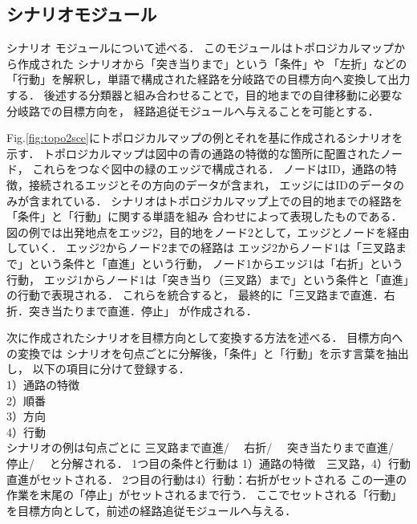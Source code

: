 \documentclass{sice-si}
\begin{document}
\subsection{シナリオモジュール}
シナリオ
モジュールについて述べる．
このモジュールはトポロジカルマップから作成された
シナリオから「突き当りまで」という「条件」や
「左折」などの「行動」を解釈し，単語で構成された経路を分岐路での目標方向へ変換して出力する．
後述する分類器と組み合わせることで，目的地までの自律移動に必要な分岐路での目標方向を，
経路追従モジュールへ与えることを可能とする．
\par
Fig.\ref{fig:topo2sce}にトポロジカルマップの例とそれを基に作成されるシナリオを示す．
トポロジカルマップは図中の青の通路の特徴的な箇所に配置されたノード，
これらをつなぐ図中の緑のエッジで構成される．
ノードはID，通路の特徴，接続されるエッジとその方向のデータが含まれ，
エッジにはIDのデータのみが含まれている．
シナリオはトポロジカルマップ上での目的地までの経路を「条件」と「行動」に関する単語を組み
合わせによって表現したものである．
図の例では出発地点をエッジ2，目的地をノード2として，エッジとノードを経由していく．
エッジ2からノード2までの経路は
エッジ2からノード1は「三叉路まで」という条件と「直進」という行動，
ノード1からエッジ1は「右折」という行動，
エッジ1からノード1は「突き当り（三叉路）まで」という条件と「直進」の行動で表現される．
これらを統合すると，
最終的に「三叉路まで直進．右折．突き当たりまで直進．停止」
が作成される．\par
次に作成されたシナリオを目標方向として変換する方法を述べる．
目標方向への変換では
シナリオを句点ごとに分解後，「条件」と「行動」を示す言葉を抽出し，
以下の項目に分けて登録する．\\
1）通路の特徴\\
2）順番\\
3）方向\\
4）行動\\
シナリオの例は句点ごとに
三叉路まで直進/　
右折/　
突き当たりまで直進/　
停止/　
と分解される．
1つ目の条件と行動は
1）通路の特徴　三叉路，4）行動　直進がセットされる．
2つ目の行動は4）行動：右折がセットされる
この一連の作業を末尾の「停止」がセットされるまで行う．
ここでセットされる「行動」を目標方向として，前述の経路追従モジュールへ与える．
\end{document}
